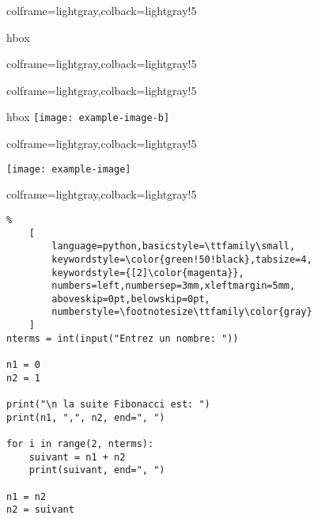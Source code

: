 \documentclass[11pt,a4paper]{ltxdoc}
\begin{document}
\begin{tcblisting}{colframe=lightgray,colback=lightgray!5}
\begin{PDFViewer}{hbox}
%
\end{PDFViewer}
\end{tcblisting}

\begin{tcblisting}{colframe=lightgray,colback=lightgray!5}
\begin{PDFViewer}[Width=14cm,Icons=false]{}
\end{PDFViewer}
\end{tcblisting}

\begin{tcblisting}{colframe=lightgray,colback=lightgray!5}
\begin{IMGViewer}[Icons=false]{hbox}
\texttt{[image: example-image-b]}
\end{IMGViewer}
\end{tcblisting}

\begin{tcblisting}{colframe=lightgray,colback=lightgray!5}
\begin{IMGViewer}[Width=12cm]{}
\texttt{[image: example-image]}
\end{IMGViewer}
\end{tcblisting}

\begin{tcblisting}{colframe=lightgray,colback=lightgray!5}
\begin{PYViewer}[width=12cm]{}
\begin{lstlisting}%
    [
        language=python,basicstyle=\ttfamily\small,
        keywordstyle=\color{green!50!black},tabsize=4,
        keywordstyle={[2]\color{magenta}},
        numbers=left,numbersep=3mm,xleftmargin=5mm,
        aboveskip=0pt,belowskip=0pt,
        numberstyle=\footnotesize\ttfamily\color{gray}
    ]
nterms = int(input("Entrez un nombre: "))

n1 = 0
n2 = 1

print("\n la suite Fibonacci est: ")
print(n1, ",", n2, end=", ")

for i in range(2, nterms):
    suivant = n1 + n2
    print(suivant, end=", ")

n1 = n2
n2 = suivant
\end{lstlisting}
\end{PYViewer}
\end{tcblisting}
\end{document}
